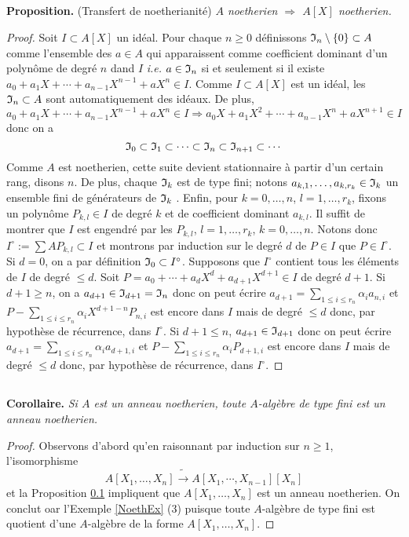 \documentclass[a4paper, 12pt]{amsart}
\begin{document}
\subsection{}\label{NoethTransfert}\textbf{Proposition.} (Transfert de noetherianité) \textit{$A$ noetherien $\Rightarrow$ $A[X]$ noetherien.}
\begin{proof}Soit $I\subset A[X]$ un idéal. Pour chaque $n\geq 0$ définissons $\frak{I}_n\setminus \lbrace 0\rbrace\subset A$ comme l'ensemble des $a\in A$ qui apparaissent comme coefficient dominant  d'un polynôme de degré $n$ dand $I$ \textit{i.e.} $a\in \frak{I}_n$ si et seulement si il existe $a_0+a_1X+\cdots+a_{n-1}X^{n-1}+aX^n\in I$. Comme $I\subset A[X]$ est un idéal, les $\frak{I}_n\subset A$ sont automatiquement des idéaux. De plus,  $$a_0+a_1X+\cdots+a_{n-1}X^{n-1}+aX^n\in I\Rightarrow a_0X+a_1X^2+\cdots+a_{n-1}X^{n}+aX^{n+1}\in I$$ donc on a 
$$\frak{I}_0\subset \frak{I}_1\subset \cdots\subset \frak{I}_n\subset \frak{I}_{n+1}\subset \cdots$$
Comme $A$ est noetherien, cette suite devient stationnaire à partir d'un certain rang, disons $n$. De plus,  chaque $\frak{I}_k$ est de type fini; notons $a_{k,1},\dots, a_{k,r_k}\in \frak{I}_k$ un ensemble fini de générateurs de $\frak{I}_k$ . Enfin,  pour  $k=0,\dots, n$, $l=1,\dots, r_k$, fixons un polynôme $P_{k,l}\in I$ de degré $k$ et de coefficient dominant $a_{k,l}$. Il suffit de montrer que $I$ est engendré par les $P_{k,l}$,  $l=1,\dots, r_k$, $k=0,\dots, n$. Notons donc $I^\circ:=\sum AP_{k,l}\subset I$ et montrons par induction sur le degré $d$ de $P\in I$ que $P\in I^\circ$. Si $d=0$, on a par définition $  \frak{I}_0\subset I^\circ$. Supposons que $I^\circ$ contient tous les   éléments de $I$ de degré $\leq d$. Soit $P=a_0+\cdots+a_dX^d+a_{d+1}X^{d+1}\in I$ de degré $d+1$. Si $d+1\geq n$, on a $a_{d+1}\in \frak{I}_{d+1}=\frak{I}_n$ donc on peut écrire $a_{d+1}=\sum_{1\leq i\leq r_n}\alpha_ia_{n,i}$ et $P-\sum_{1\leq i\leq r_n}\alpha_iX^{d+1-n}P_{n,i}$ est encore dans $I$ mais de degré $\leq d$ donc, par hypothèse de récurrence, dans $I^\circ$. Si $d+1\leq n$, $a_{d+1}\in \frak{I}_{d+1}$ donc on peut écrire $a_{d+1}=\sum_{1\leq i\leq r_n}\alpha_ia_{d+1,i}$ et $P-\sum_{1\leq i\leq r_n}\alpha_i P_{d+1,i}$ est encore dans $I$ mais de degré $\leq d$ donc, par hypothèse de récurrence, dans $I^\circ$. 
\end{proof}


\subsection{}\label{NoethTransfertCor}\textbf{Corollaire.} \textit{Si $A$ est un anneau noetherien, toute $A$-algèbre de type fini est un anneau noetherien.}
\begin{proof} Observons d'abord qu'en raisonnant par induction sur $n\geq 1$,   l'isomorphisme $$A[X_1,\dots, X_n]\tilde{\rightarrow} A[X_1,\cdots,X_{n-1}] [X_n]$$ et la Proposition \ref{NoethTransfert} impliquent que $A[X_1,\dots, X_n]$ est un anneau noetherien. On conclut oar l'Exemple \ref{NoethEx} (3) puisque toute $A$-algèbre de type fini  est quotient d'une $A$-algèbre de la forme $A[X_1,\dots, X_n]$. \end{proof}
\end{document}

